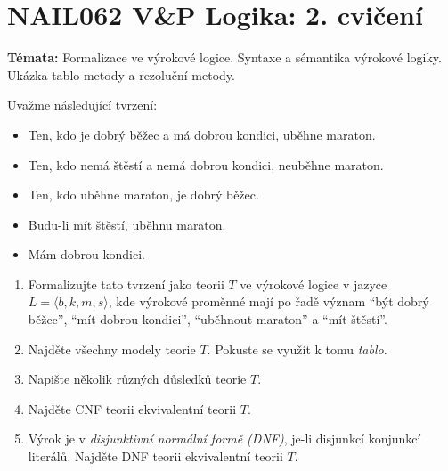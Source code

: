 \documentclass[a4paper,12pt]{article}
\begin{document}
\section*{NAIL062 V\&P Logika: 2. cvičení}


\textbf{Témata:} 
Formalizace ve výrokové logice. Syntaxe a sémantika výrokové logiky. Ukázka tablo metody a rezoluční metody.


\medskip\begin{problem}
Uvažme následující tvrzení:
\begin{itemize}\it
\item Ten, kdo je dobrý běžec a má dobrou kondici, uběhne maraton.
\item Ten, kdo nemá štěstí a nemá dobrou kondici, neuběhne maraton.
\item Ten, kdo uběhne maraton, je dobrý běžec.
\item Budu-li mít štěstí, uběhnu maraton.
\item Mám dobrou kondici.
\end{itemize}
\begin{enumerate}
\item Formalizujte tato tvrzení jako teorii $T$ ve výrokové logice v jazyce $L=\langle b, k, m, s\rangle$, kde výrokové proměnné mají po řadě význam ``být dobrý běžec'', ``mít dobrou kondici'', ``uběhnout maraton'' a ``mít štěstí''.
\item Najděte všechny modely teorie $T$. Pokuste se využít k tomu \emph{tablo}.
\item Napište několik různých důsledků teorie $T$.
\item Najděte CNF teorii ekvivalentní teorii $T$.
\item Výrok je v \emph{disjunktivní normální formě (DNF)}, je-li disjunkcí konjunkcí literálů. Najděte DNF teorii ekvivalentní teorii $T$. 
\end{enumerate}
\end{problem}
\end{document}
